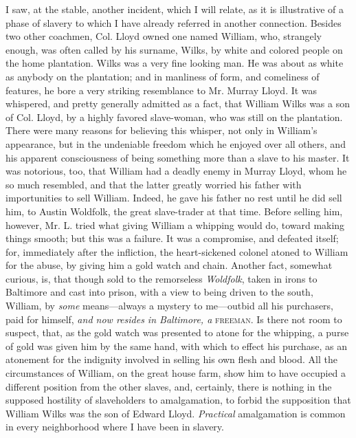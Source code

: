 I saw, at the stable, another incident, which I will relate, as it is
illustrative of a phase of slavery to which I have already referred in
another connection. {}Besides two other coachmen, Col. Lloyd owned one
named William, who, strangely enough, was often called by his surname,
Wilks, by white and colored people on the home plantation. Wilks was a
very fine looking man. He was about as white as anybody on the
plantation; and in manliness of form, and comeliness of features, he
bore a very striking resemblance to Mr. Murray Lloyd. It was whispered,
and pretty generally admitted as a fact, that William Wilks was a son of
Col. Lloyd, by a highly favored slave-woman, who was still on the
plantation. There were many reasons for believing this whisper, not only
in William's appearance, but in the undeniable freedom which he enjoyed
over all others, and his apparent consciousness of being something more
than a slave to his master. It was notorious, too, that William had a
deadly enemy in Murray Lloyd, whom he so much resembled, and that the
latter greatly worried his father with importunities to sell William.
Indeed, he gave his father no rest until he did sell him, to Austin
Woldfolk, the great slave-trader at that time. Before selling him,
however, Mr. L. tried what giving William a whipping would do, toward
making things smooth; but this was a failure. It was a compromise, and
defeated itself; for, immediately after the infliction, the
heart-sickened colonel atoned to William for the abuse, by giving him a
gold watch and chain. Another fact, somewhat curious, is, that though
sold to the remorseless \emph{Woldfolk}, taken in irons to Baltimore and
cast into prison, with a view to being driven to the south, William, by
\emph{some} means---always a mystery to me---outbid all his
{}purchasers, paid for himself, \emph{and now resides in Baltimore, a}
\textsc{freeman}. Is there not room to suspect, that, as the gold watch
was presented to atone for the whipping, a purse of gold was given him
by the same hand, with which to effect his purchase, as an atonement for
the indignity involved in selling his own flesh and blood. All the
circumstances of William, on the great house farm, show him to have
occupied a different position from the other slaves, and, certainly,
there is nothing in the supposed hostility of slaveholders to
amalgamation, to forbid the supposition that William Wilks was the son
of Edward Lloyd. \emph{Practical} amalgamation is common in every
neighborhood where I have been in slavery.

